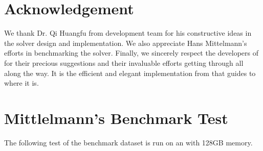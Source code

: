 \documentclass[10pt]{article}
\begin{document}
{\section{Acknowledgement}

We thank Dr. Qi Huangfu from  development team for his
constructive ideas in the solver design and implementation. We also appreciate
Hans Mittelmann's efforts in benchmarking the solver. Finally, we sincerely
respect the developers of  for their precious suggestions
{\cite{benson2008algorithm}} and their invaluable efforts getting
 through all along the way. It is the efficient and elegant
implementation from  that guides  to
where it is.





\newpage
\appendix\section{Mittlelmann's Benchmark Test}

The following test of the benchmark dataset is run on an  with 128GB memory.

{\small{\begin{table}[h]
  \begin{center}
  

\end{center}
\end{table}}}}
\end{document}
